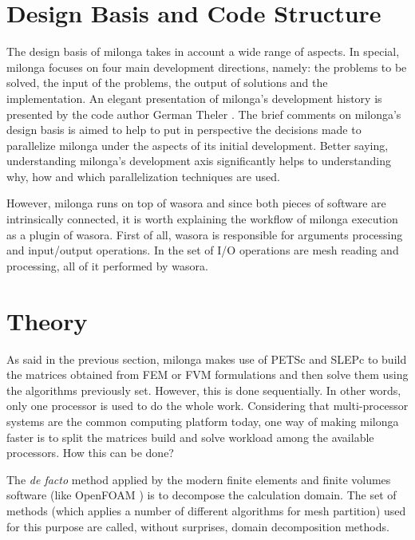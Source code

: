 \documentclass{anstrans}
\begin{document}
\section{Design Basis and Code Structure}


The design basis of milonga takes in account a wide range of aspects. 
In special, milonga focuses on four main development directions, namely:
the problems to be solved, the input of the problems, the 
output of solutions and the implementation. An elegant presentation 
of milonga's development history is presented by the code author 
German Theler \cite{Theler2014}. The brief comments on milonga's 
design basis is aimed to help to put in perspective the decisions 
made to parallelize milonga under the aspects of its initial development.
Better saying, understanding milonga's development 
axis significantly helps to understanding why, how and which parallelization techniques are used.

However, milonga runs on top of wasora and since both pieces of software 
are intrinsically connected, it is worth explaining the workflow of milonga 
execution as a plugin of wasora. First of all, wasora is responsible for 
arguments processing and input/output operations. In the set of I/O operations 
are mesh reading and processing, all of it performed by wasora. 

\section{Theory}

As said in the previous section, milonga makes use of PETSc and SLEPc to
build the matrices obtained from FEM or FVM formulations and then solve
them using the algorithms previously set. However, this is done sequentially.
In other words, only one processor is used to do the whole work. Considering
that multi-processor systems are the common computing platform today, one
way of making milonga faster is to split the matrices build and solve workload
among the available processors. How this can be done?

The \textit{de facto} method applied by the modern finite elements and
finite volumes software (like OpenFOAM \cite{OpenFOAM}) is to decompose
the calculation domain. The set of methods (which applies a number of
different algorithms for mesh partition) used for this purpose are
called, without surprises, domain decomposition methods.
\end{document}
